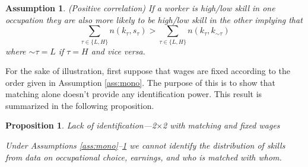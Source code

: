 \documentclass[12 pt]{article}
\newtheorem{assumption}{Assumption} %
\newtheorem{proposition}{Proposition} %
\begin{document}
\begin{assumption}
	(Positive correlation) If a worker is high/low skill in one occupation they are also more likely to be high/low skill in the other implying that
	\begin{equation*}
		\sum_{\tau\in\{L,H\}}n(k_\tau,s_\tau) > \sum_{\tau\in\{L,H\}}n(k_\tau,k_{\sim \tau})
	\end{equation*}
	where $\sim \tau = L$ if $\tau = H$ and vice versa. 
	\label{ass:correl}
\end{assumption}

For the sake of illustration, first suppose that wages are fixed according to the order given in Assumption \ref{ass:mono}. The purpose of this is to show that matching alone doesn't provide any identification power. This result is summarized in the following proposition.
\begin{proposition}{Lack of identification---2$\times$2 with matching and fixed wages}
	
	Under Assumptions \ref{ass:mono}--\ref{ass:correl} we cannot identify the distribution of skills from data on occupational choice, earnings, and who is matched with whom. 
	\label{prop:noidentmatch}
\end{proposition}
\end{document}
